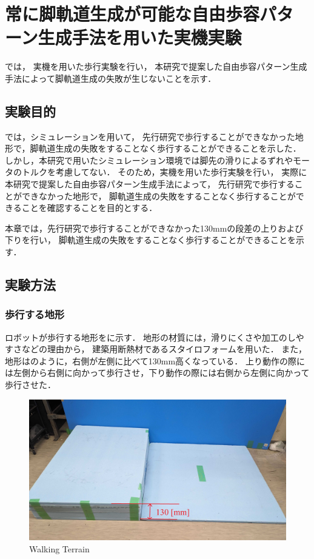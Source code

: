 ﻿
\chapter{常に脚軌道生成が可能な自由歩容パターン生成手法を用いた実機実験}\label{chapter:常に脚軌道生成が可能な自由歩容パターン生成手法を用いた実機実験}

では，
実機を用いた歩行実験を行い，
本研究で提案した自由歩容パターン生成手法によって脚軌道生成の失敗が生じないことを示す．

\section{実験目的}
では，シミュレーションを用いて，
先行研究で歩行することができなかった地形で，脚軌道生成の失敗をすることなく歩行することができることを示した．
しかし，本研究で用いたシミュレーション環境では脚先の滑りによるずれやモータのトルクを考慮してない．
そのため，実機を用いた歩行実験を行い，
実際に本研究で提案した自由歩容パターン生成手法によって，
先行研究で歩行することができなかった地形で，
脚軌道生成の失敗をすることなく歩行することができることを確認することを目的とする．

本章では，先行研究で歩行することができなかった130mmの段差の上りおよび下りを行い，
脚軌道生成の失敗をすることなく歩行することができることを示す．

\section{実験方法}
\subsection{歩行する地形}
ロボットが歩行する地形をに示す．
地形の材質には，滑りにくさや加工のしやすさなどの理由から，
建築用断熱材であるスタイロフォームを用いた．
また，地形はのように，右側が左側に比べて130mm高くなっている．
上り動作の際には左側から右側に向かって歩行させ，下り動作の際には右側から左側に向かって歩行させた．

\begin{figure}[tb]
  \centering
  \includegraphics[width=0.8\linewidth]{figure/chapter5/walking-terrain.jpg}
  \caption{Walking Terrain}
  \label{fig:walking-terrain}
\end{figure}

